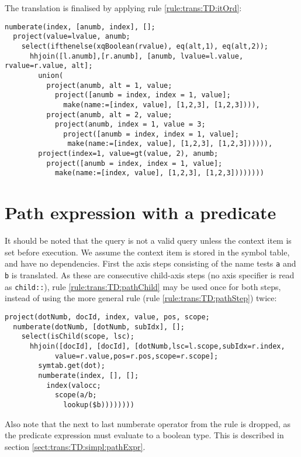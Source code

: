 The translation is finalised by applying rule \ref{rule:trans:TD:itOrd}:

\begin{Verbatim}
numberate(index, [anumb, index], [];
  project(value=lvalue, anumb;
    select(ifthenelse(xqBoolean(rvalue), eq(alt,1), eq(alt,2));
      hhjoin([l.anumb],[r.anumb], [anumb, lvalue=l.value, rvalue=r.value, alt];
        union(
          project(anumb, alt = 1, value;
            project([anumb = index, index = 1, value];
              make(name:=[index, value], [1,2,3], [1,2,3]))),
          project(anumb, alt = 2, value;
            project(anumb, index = 1, value = 3;
              project([anumb = index, index = 1, value];
               make(name:=[index, value], [1,2,3], [1,2,3]))))),
        project(index=1, value=gt(value, 2), anumb;
          project([anumb = index, index = 1, value];
            make(name:=[index, value], [1,2,3], [1,2,3])))))))
\end{Verbatim}

\section{Path expression with a predicate}
\label{appendix:transl:pathPred}

It should be noted that the query is not a valid query unless the context item is set before execution. We assume
the context item is stored in the symbol table, and have no dependencies. First the axis steps consisting of the
name tests \texttt{a} and \texttt{b} is translated. As these are consecutive child-axis steps (no axis specifier
is read as \texttt{child::}), rule \ref{rule:trans:TD:pathChild} may be used once for both steps, instead of using
the more general rule (rule \ref{rule:trans:TD:pathStep}) twice:
\begin{Verbatim}
project(dotNumb, docId, index, value, pos, scope;
  numberate(dotNumb, [dotNumb, subIdx], [];
    select(isChild(scope, lsc);
      hhjoin([docId], [docId], [dotNumb,lsc=l.scope,subIdx=r.index,
            value=r.value,pos=r.pos,scope=r.scope];
        symtab.get(dot);
        numberate(index, [], [];
          index(valocc;
            scope(a/b;
              lookup($b))))))))
\end{Verbatim}
Also note that the next to last \textsf{numberate} operator from the rule is dropped, as the predicate expression
must evaluate to a boolean type. This is described in section \ref{sect:trans:TD:simpl:pathExpr}.

